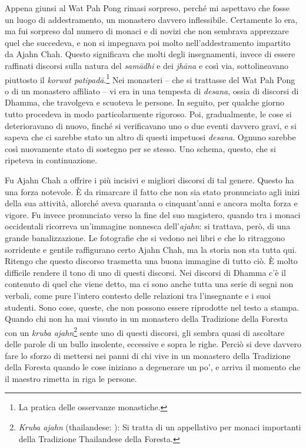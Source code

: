 Appena giunsi al Wat Pah Pong rimasi sorpreso, perché mi aspettavo che
fosse un luogo di addestramento, un monastero davvero inflessibile.
Certamente lo era, ma fui sorpreso dal numero di monaci e di novizi che
non sembrava apprezzare quel che succedeva, e non si impegnava poi molto
nell'addestramento impartito da Ajahn Chah. Questo significava che molti
degli insegnamenti, invece di essere raffinati discorsi sulla natura del
\emph{samādhi} e dei \emph{jhāna} e così via, sottolineavano piuttosto
il \emph{korwat patipadā}.\footnote{La pratica delle osservanze
  monastiche.} Nei monasteri -- che si trattasse del Wat Pah Pong o di
un monastero affiliato -- vi era in una tempesta di \emph{desana}, ossia
di discorsi di Dhamma, che travolgeva e scuoteva le persone. In seguito,
per qualche giorno tutto procedeva in modo particolarmente rigoroso.
Poi, gradualmente, le cose si deterioravano di nuovo, finché si
verificavano uno o due eventi davvero gravi, e si sapeva che ci sarebbe
stato un altro di questi impetuosi \emph{desana}. Ognuno sarebbe così
nuovamente stato di sostegno per se stesso. Uno schema, questo, che si
ripeteva in continuazione.

Fu Ajahn Chah a offrire i più incisivi e migliori discorsi di tal
genere. Questo ha una forza notevole. È da rimarcare il fatto che non
sia stato pronunciato agli inizi della sua attività, allorché aveva
quaranta o cinquant'anni e ancora molta forza e vigore. Fu invece
pronunciato verso la fine del suo magistero, quando tra i monaci
occidentali ricorreva un'immagine nonnesca dell'\emph{ajahn}: si
trattava, però, di una grande banalizzazione. Le fotografie che si
vedono nei libri e che lo ritraggono sorridente e gentile raffigurano
certo Ajahn Chah, ma la storia non sta tutta qui. Ritengo che questo
discorso trasmetta una buona immagine di tutto ciò. È molto difficile
rendere il tono di uno di questi discorsi. Nei discorsi di Dhamma c'è il
contenuto di quel che viene detto, ma ci sono anche tutta una serie di
segni non verbali, come pure l'intero contesto delle relazioni tra
l'insegnante e i suoi studenti. Sono cose, queste, che non possono
essere riprodotte nel testo a stampa. Quando chi non ha mai vissuto in
un monastero della Tradizione della Foresta con un \emph{kruba
ajahn}\footnote{\emph{Kruba ajahn} (thailandese: ): Si
  tratta di un appellativo per monaci importanti della Tradizione
  Thailandese della Foresta.} sente uno di questi discorsi, gli sembra
quasi di ascoltare delle parole di un bullo insolente, eccessive e sopra
le righe. Perciò si deve davvero fare lo sforzo di mettersi nei panni di
chi vive in un monastero della Tradizione della Foresta quando le cose
iniziano a degenerare un po', e arriva il momento che il maestro rimetta
in riga le persone.

